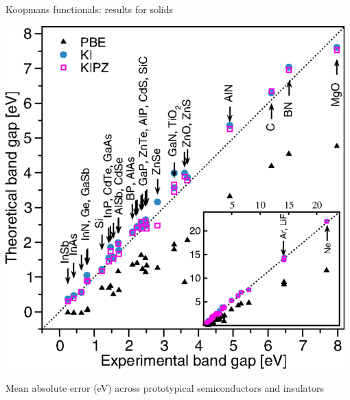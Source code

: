 \documentclass[xcolor=table,aspectratio=169]{beamer}
\numberwithin{equation}{section}
\begin{document}
% 
% 
% 

\begin{frame}{Koopmans functionals: results for solids}
   \begin{minipage}[c]{0.35\textwidth}
      \includegraphics[width=\textwidth]{figures/fig_nguyen_prx_bandgaps.png}
   \end{minipage}
   \hspace{1em}
   \begin{minipage}[c]{0.6\textwidth}

      \footnotesize
      Mean absolute error (eV) across prototypical semiconductors and insulators


\end{minipage}
\end{frame}
\end{document}
